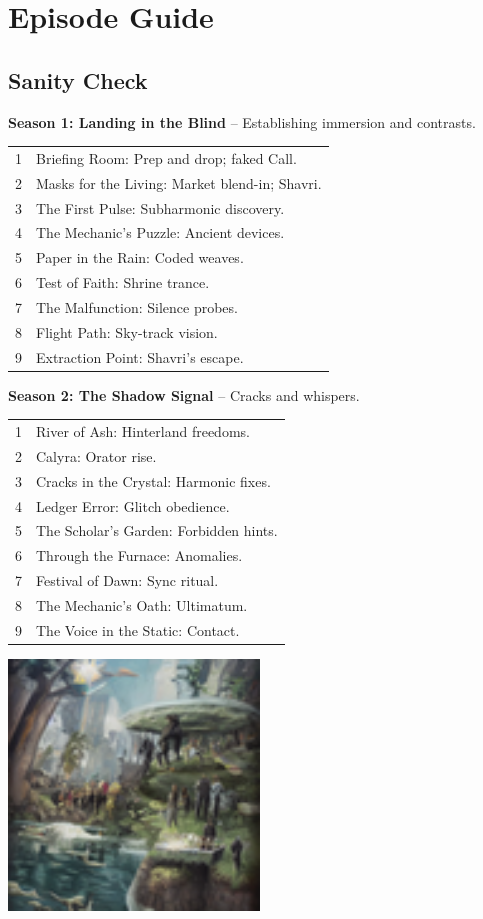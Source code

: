 \documentclass[10pt,letterpaper]{article}
\begin{document}
\section{Episode Guide}
\subsection{Sanity Check}
\textbf{Season 1: Landing in the Blind} – Establishing immersion and contrasts.
\begin{longtable}{p{} p{}}
1 & Briefing Room: Prep and drop; faked Call. \\
2 & Masks for the Living: Market blend-in; Shavri. \\
3 & The First Pulse: Subharmonic discovery. \\
4 & The Mechanic’s Puzzle: Ancient devices. \\
5 & Paper in the Rain: Coded weaves. \\
6 & Test of Faith: Shrine trance. \\
7 & The Malfunction: Silence probes. \\
8 & Flight Path: Sky-track vision. \\
9 & Extraction Point: Shavri's escape.
\end{longtable}

\textbf{Season 2: The Shadow Signal} – Cracks and whispers.
\begin{longtable}{p{} p{}}
1 & River of Ash: Hinterland freedoms. \\
2 & Calyra: Orator rise. \\
3 & Cracks in the Crystal: Harmonic fixes. \\
4 & Ledger Error: Glitch obedience. \\
5 & The Scholar’s Garden: Forbidden hints. \\
6 & Through the Furnace: Anomalies. \\
7 & Festival of Dawn: Sync ritual. \\
8 & The Mechanic’s Oath: Ultimatum. \\
9 & The Voice in the Static: Contact.
\end{longtable}

\begin{center}
\includegraphics[width=0.5\textwidth]{season_image1.jpg} %
{}
\end{center}
\end{document}
